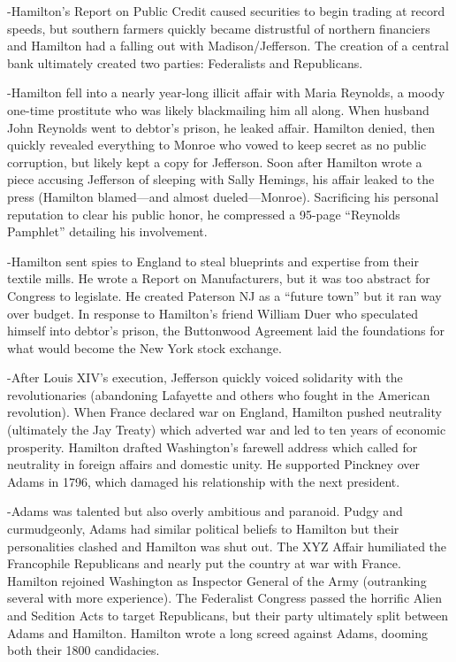 \documentclass[
]{article}
\begin{document}
-Hamilton's Report on Public Credit caused securities to begin trading
at record speeds, but southern farmers quickly became distrustful of
northern financiers and Hamilton had a falling out with
Madison/Jefferson. The creation of a central bank ultimately created two
parties: Federalists and Republicans.

-Hamilton fell into a nearly year-long illicit affair with Maria
Reynolds, a moody one-time prostitute who was likely blackmailing him
all along. When husband John Reynolds went to debtor's prison, he leaked
affair. Hamilton denied, then quickly revealed everything to Monroe who
vowed to keep secret as no public corruption, but likely kept a copy for
Jefferson. Soon after Hamilton wrote a piece accusing Jefferson of
sleeping with Sally Hemings, his affair leaked to the press (Hamilton
blamed---and almost dueled---Monroe). Sacrificing his personal
reputation to clear his public honor, he compressed a 95-page ``Reynolds
Pamphlet'' detailing his involvement.

-Hamilton sent spies to England to steal blueprints and expertise from
their textile mills. He wrote a Report on Manufacturers, but it was too
abstract for Congress to legislate. He created Paterson NJ as a ``future
town'' but it ran way over budget. In response to Hamilton's friend
William Duer who speculated himself into debtor's prison, the Buttonwood
Agreement laid the foundations for what would become the New York stock
exchange.

-After Louis XIV's execution, Jefferson quickly voiced solidarity with
the revolutionaries (abandoning Lafayette and others who fought in the
American revolution). When France declared war on England, Hamilton
pushed neutrality (ultimately the Jay Treaty) which adverted war and led
to ten years of economic prosperity. Hamilton drafted Washington's
farewell address which called for neutrality in foreign affairs and
domestic unity. He supported Pinckney over Adams in 1796, which damaged
his relationship with the next president.

-Adams was talented but also overly ambitious and paranoid. Pudgy and
curmudgeonly, Adams had similar political beliefs to Hamilton but their
personalities clashed and Hamilton was shut out. The XYZ Affair
humiliated the Francophile Republicans and nearly put the country at war
with France. Hamilton rejoined Washington as Inspector General of the
Army (outranking several with more experience). The Federalist Congress
passed the horrific Alien and Sedition Acts to target Republicans, but
their party ultimately split between Adams and Hamilton. Hamilton wrote
a long screed against Adams, dooming both their 1800 candidacies.
\end{document}
